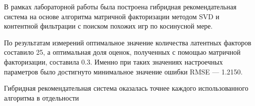 
В рамках лабораторной работы была построена гибридная рекомендательная система на основе алгоритма матричной факторизации методом SVD и контентной фильтрации с поиском похожих игр по косинусной мере.

По результатам измерений оптимальное значение количества латентных факторов составило 25, а оптимальная доля оценок, полученных с помощью матричной факторизации, составила 0.3.  Именно при таких значениях настроечных параметров было достигнуто минимальное значение ошибки RMSE --- 1.2150.

Гибридная рекомендательная система оказалась точнее каждого использованного алгоритма в отдельности
